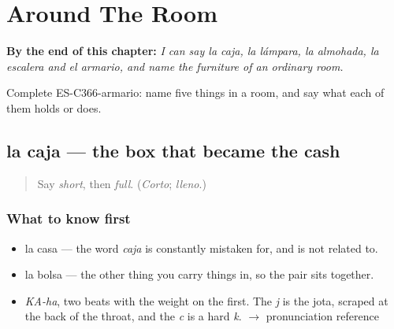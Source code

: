 
\chapter{Around The Room}
\label{ch:la-caja-y-la-lampara}

\begin{chapteropening}
\textbf{By the end of this chapter:} \emph{I can say la caja, la lámpara, la almohada, la escalera and el armario, and name the furniture of an ordinary room.}

Complete ES-C366-armario: name five things in a room, and say what each of them holds or does.
\end{chapteropening}

\section[la caja]{la caja — the box that became the cash}

\label{lesson:ES-C366-caja}



\begin{quote}
Say \emph{short}, then \emph{full}. (\emph{Corto}; \emph{lleno}.)
\end{quote}

\subsection*{What to know first}
\begin{itemize}
\raggedright
  \item la casa — the word \emph{caja} is constantly mistaken for, and is not related to.
  \item la bolsa — the other thing you carry things in, so the pair sits together.
\end{itemize}

\begin{sounds}
\begin{itemize}
\raggedright
  \item \emph{KA-ha}, two beats with the weight on the first. The \emph{j} is the jota, scraped at the back of the throat, and the \emph{c} is a hard \emph{k}. $\to$ pronunciation reference
\end{itemize}
\end{sounds}

